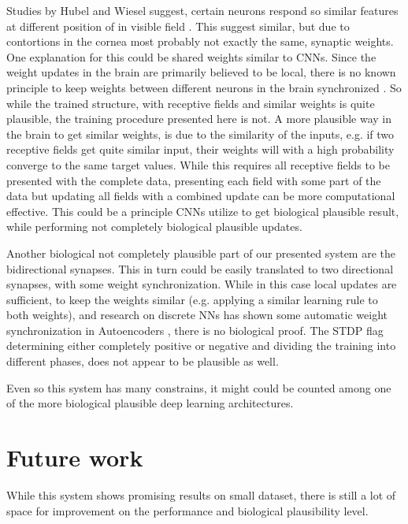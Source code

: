 Studies by Hubel and Wiesel suggest, certain neurons respond so similar features at different position of in visible field \cite{Hubel1959}.
This suggest similar, but due to contortions in the cornea most probably not exactly the same, synaptic weights. 
One explanation for this could be shared weights similar to CNNs. 
Since the weight updates in the brain are primarily believed to be local, there is no known principle to keep weights between different neurons in the brain synchronized \cite{DBLP:journals/corr/ScellierB16}.
So while the trained structure, with receptive fields and similar weights is quite plausible, the training procedure presented here is not.
A more plausible way in the brain to get similar weights, is due to the similarity of the inputs, e.g. if two receptive fields get quite similar input, their weights will with a high probability converge to the same target values.  
While this requires all receptive fields to be presented with the complete data, presenting each field with some part of the data but updating all fields with a combined update can be more computational effective. 
This could be a principle CNNs utilize to get biological plausible result, while performing not completely biological plausible updates.

Another biological not completely plausible part of our presented system are the bidirectional synapses.
This in turn could be easily translated to two directional synapses, with some weight synchronization. 
While in this case local updates are sufficient, to keep the weights similar (e.g. applying a similar learning rule to both weights), and research on discrete NNs has shown some automatic weight synchronization in Autoencoders \cite{vincent2010stacked}, there is no biological proof.
The STDP flag determining either completely positive or negative and dividing the training into different phases, does not appear to be plausible as well.

Even so this system has many constrains, it might could be counted among one of the more biological plausible deep learning architectures.     

\section{Future work} \label{c:future}

While this system shows promising results on small dataset, there is still a lot of space for improvement on the performance and biological plausibility level.

